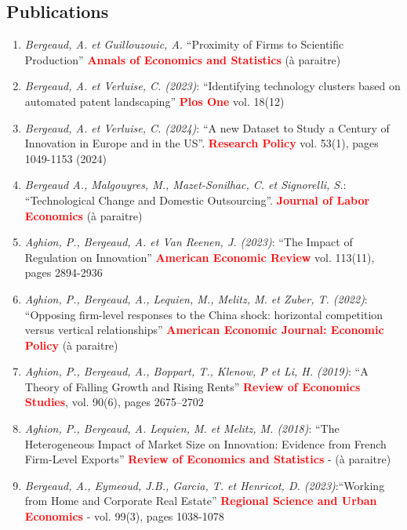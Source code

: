 \documentclass[12pt]{article}
\begin{document}
\subsection*{Publications}
\begin{footnotesize}
    \begin{enumerate}
    \item  \emph{Bergeaud, A. et Guillouzouic, A.} ``Proximity of Firms to Scientific Production'' \textbf{\textcolor{red}{Annals of Economics and Statistics}}  (à paraitre) 
    \item \emph{Bergeaud, A. et Verluise, C.  (2023)}: ``Identifying technology clusters based on automated patent landscaping'' \textbf{\textcolor{red}{Plos One}} vol. 18(12)
    \item \emph{Bergeaud, A. et Verluise, C.  (2024)}: ``A new Dataset to Study a Century of Innovation in Europe and in the US''. \textbf{\textcolor{red}{Research Policy}} vol. 53(1), pages 1049-1153 (2024)
    \item \emph{Bergeaud A., Malgouyres, M., Mazet-Sonilhac, C. et Signorelli, S.}: ``Technological Change and Domestic Outsourcing''. \textbf{\textcolor{red}{Journal of Labor Economics}} (à paraitre)
    \item \emph{Aghion, P., Bergeaud, A. et Van Reenen, J. (2023)}: ``The Impact of Regulation on Innovation'' \textbf{\textcolor{red}{American Economic Review}} vol. 113(11), pages 2894-2936
    \item \emph{Aghion, P., Bergeaud, A., Lequien, M., Melitz, M. et Zuber, T. (2022)}: ``Opposing firm-level responses to the China shock: horizontal competition versus vertical relationships'' \textbf{\textcolor{red}{American Economic Journal: Economic Policy}} (à paraitre)
    \item \emph{Aghion, P., Bergeaud, A., Boppart, T., Klenow, P et Li, H. (2019)}: ``A Theory of Falling Growth and Rising Rents'' \textbf{\textcolor{red}{Review of Economics Studies}}, vol. 90(6), pages 2675–2702 
    \item \emph{Aghion, P., Bergeaud, A. Lequien, M. et Melitz, M. (2018)}: ``The Heterogeneous Impact of Market Size on Innovation: Evidence from French Firm-Level Exports'' \textbf{\textcolor{red}{Review of Economics and Statistics}} - (à paraitre)
    \item \emph{Bergeaud, A., Eymeoud, J.B., Garcia, T. et Henricot, D. (2023)}:``Working from Home and Corporate Real Estate'' \textbf{\textcolor{red}{Regional Science and Urban Economics}} - vol. 99(3), pages 1038-1078

\end{enumerate}
\end{footnotesize}
\end{document}
